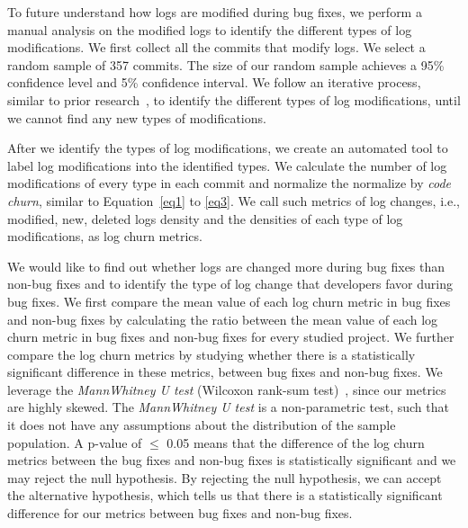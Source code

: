 
To future understand how logs are modified during bug fixes, we perform a manual analysis on the modified logs to identify the different types of log modifications. We first collect all the commits that modify logs. We select a random sample of 357 commits. The size of our random sample achieves a 95\% confidence level and 5\% confidence interval. We follow an iterative process, similar to prior research~\cite{seaman1999qualitative}, to identify the different types of log modifications, until we cannot find any new types of modifications. 

After we identify the types of log modifications, we create an automated tool to label log modifications into the identified types. We calculate the number of log modifications of every type in each commit and normalize the normalize by {\em code churn}, similar to Equation~\ref{eq1} to \ref{eq3}. We call such metrics of log changes, i.e., modified, new, deleted logs density and the densities of each type of log modifications, as log churn metrics.

We would like to find out whether logs are changed more during bug fixes than non-bug fixes and to identify the type of log change that developers favor during bug fixes. We first compare the mean value of each log churn metric in bug fixes and non-bug fixes by calculating the ratio between the mean value of each log churn metric in bug fixes and non-bug fixes for every studied project. We further compare the log churn metrics by studying whether there is a statistically significant difference in these metrics, between bug fixes and non-bug fixes. We leverage the \textsl{MannWhitney U test} (Wilcoxon rank-sum test)~\cite{Gehan1965}, since our metrics are highly skewed. The {\em MannWhitney U test} is a non-parametric test, such that it does not have any assumptions about the distribution of the sample population. A p-value of \ensuremath{\le} 0.05 means that the difference of the log churn metrics between the bug fixes and non-bug fixes is statistically significant and we may reject the null hypothesis. By rejecting the null hypothesis, we can accept the alternative hypothesis, which tells us that there is a statistically significant difference for our metrics between bug fixes and non-bug fixes.

